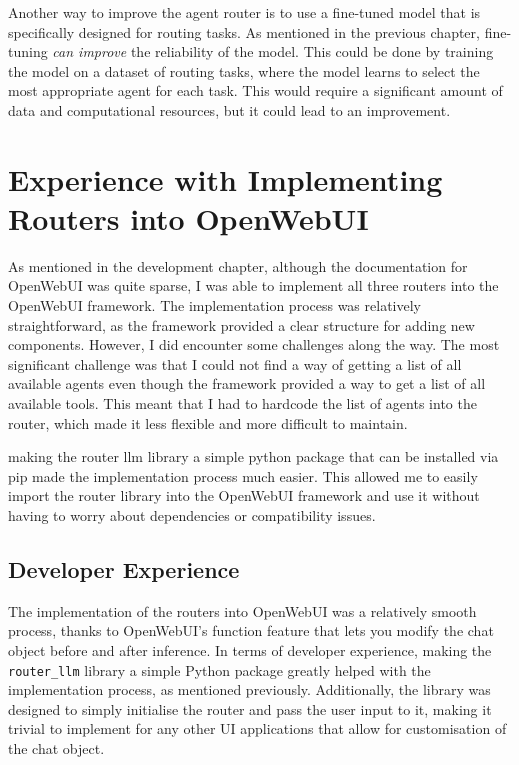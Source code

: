Another way to improve the agent router is to use a fine-tuned model that is specifically designed for routing tasks. As mentioned in the previous chapter, fine-tuning \textit{can improve} the reliability of the model. This could be done by training the model on a dataset of routing tasks, where the model learns to select the most appropriate agent for each task. This would require a significant amount of data and computational resources, but it could lead to an improvement.

\section{Experience with Implementing Routers into OpenWebUI}
\label{sec:results-implementation}
As mentioned in the development chapter, although the documentation for OpenWebUI was quite sparse, I was able to implement all three routers into the OpenWebUI framework. The implementation process was relatively straightforward, as the framework provided a clear structure for adding new components. However, I did encounter some challenges along the way. The most significant challenge was that I could not find a way of getting a list of all available agents even though the framework provided a way to get a list of all available tools. This meant that I had to hardcode the list of agents into the router, which made it less flexible and more difficult to maintain. 

making the router llm library a simple python package that can be installed via pip made the implementation process much easier. This allowed me to easily import the router library into the OpenWebUI framework and use it without having to worry about dependencies or compatibility issues.

\subsection{Developer Experience}
\label{sec:results-developer-experience}
The implementation of the routers into OpenWebUI was a relatively smooth process, thanks to OpenWebUI's function feature that lets you modify the chat object before and after inference. In terms of developer experience, making the \texttt{router\_llm} library a simple Python package greatly helped with the implementation process, as mentioned previously. Additionally, the library was designed to simply initialise the router and pass the user input to it, making it trivial to implement for any other UI applications that allow for customisation of the chat object.


